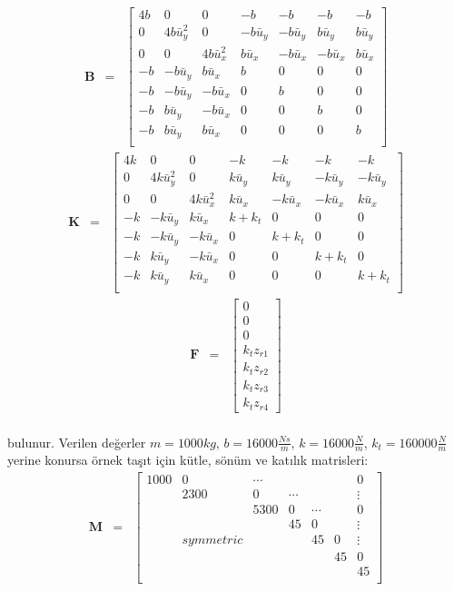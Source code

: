 \documentclass[a4paper]{report}
\begin{document}
\begin{eqnarray*}
\mathbf{B}&=&\left[ 
\begin{array}{ccccccc}
4b&0&0&-b&-b&-b&-b\\
0&4b\bar{u}_y^2&0&-b\bar{u}_y&-b\bar{u}_y&b\bar{u}_y&b\bar{u}_y\\
0&0&4b\bar{u}_x^2&b\bar{u}_x&-b\bar{u}_x&-b\bar{u}_x&b\bar{u}_x\\
-b&-b\bar{u}_y&b\bar{u}_x&b&0&0&0\\
-b&-b\bar{u}_y&-b\bar{u}_x&0&b&0&0\\
-b&b\bar{u}_y&-b\bar{u}_x&0&0&b&0\\
-b&b\bar{u}_y&b\bar{u}_x&0&0&0&b\\
\end{array} \right]
\end{eqnarray*}
\begin{eqnarray*}
\mathbf{K}&=&\left[ 
\begin{array}{ccccccc}
4k&0&0&-k &-k &-k&-k\\
0&4k\bar{u}_y^2&0&k\bar{u}_y&k\bar{u}_y&-k\bar{u}_y&-k\bar{u}_y\\
0&0&4k\bar{u}_x^2&k\bar{u}_x&-k\bar{u}_x&-k\bar{u}_x&k\bar{u}_x\\
-k&-k\bar{u}_y&k\bar{u}_x&k+k_t&0&0&0\\
-k&-k\bar{u}_y&-k\bar{u}_x&0&k+k_t&0&0\\
-k&k\bar{u}_y&-k\bar{u}_x&0&0&k+k_t&0\\
-k&k\bar{u}_y&k\bar{u}_x&0&0&0&k+k_t\\
\end{array} \right]
\end{eqnarray*}
\begin{eqnarray*}
\mathbf{F}&=&
\left[
\begin{array}{c}
0\\
0\\
0\\
k_t z_{r1}\\
k_t z_{r2}\\
k_t z_{r3}\\
k_t z_{r4}
\end{array}
\right]
\end{eqnarray*}
\\
bulunur. Verilen değerler  $m=1000 kg$, $b=16000 \frac{Ns}{m}$, $k=16000 \frac{N}{m}$,   $k_t=160000 \frac{N}{m}$ yerine konursa örnek taşıt için kütle, sönüm ve katılık matrisleri:
\begin{eqnarray*}
\mathbf{M}&=&\left[ 
\begin{array}{ccccccc}
1000&0&\cdots&&&&0\\
&2300&0&\cdots&&&\vdots\\
&&5300&0&\cdots&&0\\
&&&45&0&&\vdots\\
&symmetric&&&45&0&\vdots\\
&&&&&45&0\\
&&&&&&45\\
\end{array} \right]
\end{eqnarray*}
\end{document}
